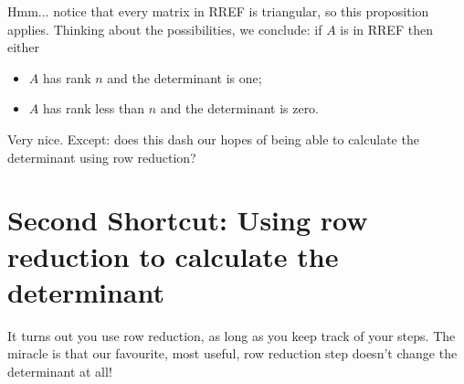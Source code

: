 Hmm... notice that every matrix in RREF is triangular, so this
proposition applies.  Thinking about the possibilities, we
conclude:  if $A$ is in RREF then either
\begin{itemize}
\item $A$ has rank $n$ and the determinant is one;
\item $A$ has rank less than $n$ and the determinant is zero.
\end{itemize}
Very nice.  Except:  does this dash our hopes of being
able to calculate the determinant using row reduction?

\section{Second Shortcut:  Using row reduction to calculate the determinant}

It turns out you  use row reduction, as long as you
keep track of your steps.  The miracle is that our favourite,
most useful, row reduction step doesn't change the determinant at all!

